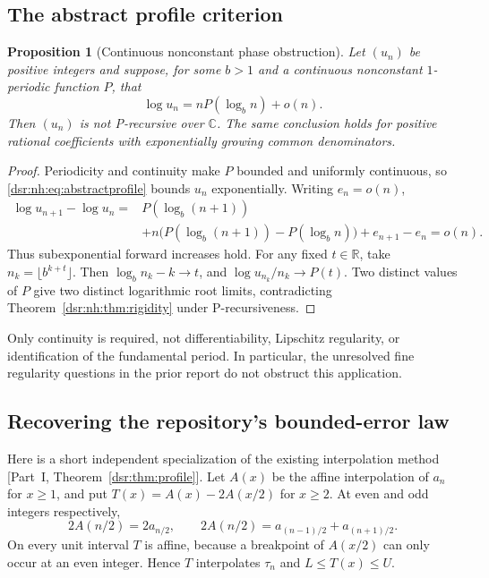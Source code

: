 \documentclass[11pt,a4paper]{article}
\numberwithin{equation}{section}
\newtheorem{proposition}[theorem]{Proposition}
\theoremstyle{definition}
\theoremstyle{remark}
\newcommand{\R}{\mathbb R}
\newcommand{\C}{\mathbb C}
\newcommand{\partref}[1]{\textup{[}Part~I, #1\textup{]}}
\theoremstyle{definition}
\theoremstyle{plain}
\begin{document}
\subsection{The abstract profile criterion}
\begin{proposition}[Continuous nonconstant phase obstruction]
\label{dsr:nh:prop:profileobstruction}
Let $(u_n)$ be positive integers and suppose, for some $b>1$ and a
continuous nonconstant $1$-periodic function $P$, that
\begin{equation}
\log u_n=nP(\log_b n)+o(n).
\label{dsr:nh:eq:abstractprofile}
\end{equation}
Then $(u_n)$ is not P-recursive over $\C$. The same conclusion holds for
positive rational coefficients with exponentially growing common
denominators.
\end{proposition}
\begin{proof}
Periodicity and continuity make $P$ bounded and uniformly continuous, so
\eqref{dsr:nh:eq:abstractprofile} bounds $u_n$ exponentially. Writing $e_n=o(n)$,
\begin{align*}
\log u_{n+1}-\log u_n
={}&P(\log_b(n+1))\\
&+n\bigl(P(\log_b(n+1))-P(\log_b n)\bigr)+e_{n+1}-e_n
=o(n).
\end{align*}
Thus subexponential forward increases hold. For any fixed $t\in\R$,
take $n_k=\lfloor b^{k+t}\rfloor$. Then
$\log_b n_k-k\to t$, and
$\log u_{n_k}/n_k\to P(t)$. Two distinct values of $P$ give two distinct
logarithmic root limits, contradicting Theorem~\ref{dsr:nh:thm:rigidity} under
P-recursiveness.
\end{proof}
Only continuity is required, not differentiability, Lipschitz regularity,
or identification of the fundamental period. In particular, the unresolved
fine regularity questions in the prior report do not obstruct this
application.

\subsection{Recovering the repository's bounded-error law}
Here is a short independent specialization of the existing interpolation
method \cite{HJT}\,\partref{Theorem~\ref{dsr:thm:profile}}. Let $A(x)$ be the affine interpolation of
$a_n$ for $x\ge1$, and put $T(x)=A(x)-2A(x/2)$ for $x\ge2$.
At even and odd integers respectively,
\[
2A(n/2)=2a_{n/2},\qquad
2A(n/2)=a_{(n-1)/2}+a_{(n+1)/2}.
\]
On every unit interval $T$ is affine, because a breakpoint of $A(x/2)$
can only occur at an even integer. Hence $T$ interpolates $\tau_n$ and
$L\le T(x)\le U$.
\end{document}
